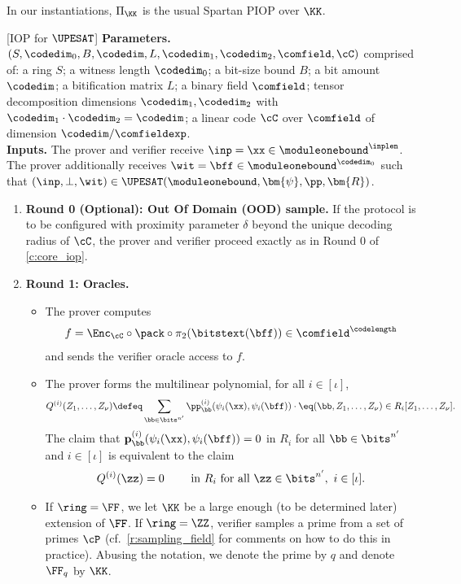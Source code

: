 In our instantiations, $\Pi_{\KK}$ is  the usual Spartan \cite{spartan} PIOP over $\KK$.



\begin{construction}\label{c:iop_pimsat}
[IOP for {$\UPESAT$}]
\noindent \textbf{Parameters.} 
$(S,\codedim_0, B, \codedim, L,  \codedim_1,\codedim_2, \comfield,\cC)$  comprised of: a ring $S$; a witness length $\codedim_0$; a bit-size bound $B$; a bit amount $\codedim$; a bitification matrix $L$; a binary field $\comfield$; tensor decomposition dimensions $\codedim_1, \codedim_2$ with $\codedim_1\cdot \codedim_2= \codedim$; a linear code $\cC$ over $\comfield$ of dimension $\codedim/\comfieldexp$.\\


\noindent \textbf{Inputs.} The prover and verifier receive $\inp=\xx\in \moduleonebound^{\inplen}$. The prover additionally receives $\wit= \bff\in \moduleonebound^{\codedim_0}$ such that $(\inp,\bot, \wit) \in \UPESAT(\moduleonebound, \bm{\psi}, \pp, \bm{R})$. 


\begin{enumerate}[leftmargin=*] 
     \item \textbf{Round 0 (Optional): Out Of Domain (OOD) sample.} If the protocol is to be configured with proximity parameter $\delta$ beyond the unique decoding radius of $\cC$, the prover and verifier proceed exactly as in Round 0 of \cref{c:core_iop}. 
\item \textbf{Round 1: Oracles.}
\begin{itemize}[leftmargin=*]
\item The prover  computes $$f= \Enc_{\cC}\circ \pack\circ\pi_2(\bitstext(\bff)) \in \comfield^{\codelength}$$  and sends  the verifier oracle access to $f$. 
\item The prover forms the multilinear polynomial, for all $i\in [\iota]$,
%
$$
Q^{(i)}(Z_1, \ldots, Z_\nu) \defeq \sum_{\bb\in\bits^{n'}}\pp_{\bb}^{(i)}(\psi_i(\xx),\psi_i(\bff)) \cdot \eq(\bb, Z_1, \ldots, Z_\nu) \in R_i[Z_1, \ldots, Z_\nu].
$$
%
The  claim that  $\mathbf{p}_{\bb}^{(i)}(\psi_i(\xx), \psi_i(\bff)) =0$ in $R_i$  for all  $\bb\in \bits^{n'}$ and $i \in [\iota]$ is equivalent to the claim 
%
\begin{equation}\label{e:iop_ideal_eq}
   Q^{(i)}(\zz) =0 \qquad  \text{ in } R_i \text{ for all } \zz\in \bits^{n'}, \ i \in [\iota].
\end{equation}
%
\item If $\ring=\FF$, we let $\KK$ be a large enough (to be determined later) extension of $\FF$. If $\ring=\ZZ$, verifier samples a prime  from a set of primes $\cP$ (cf.\ \cref{r:sampling_field} for comments on how to do this in practice). Abusing the notation, we denote the prime by $q$ and denote $\FF_q$ by $\KK$.


\end{itemize}
\end{enumerate}
\end{construction}
